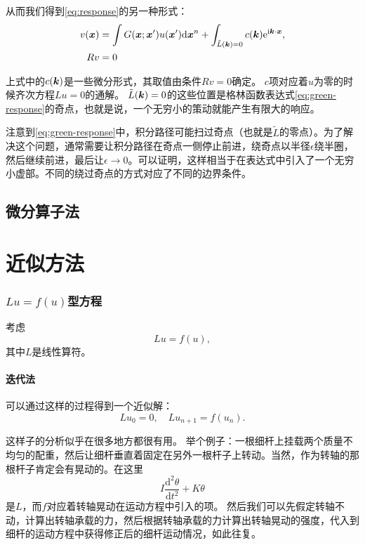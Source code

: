 \documentclass[UTF8, a4paper]{ctexart}
\newcommand*{\ii}{\mathrm{i}}
\newcommand*{\ee}{\mathrm{e}}
\begin{document}
从而我们得到\eqref{eq:response}的另一种形式：
\begin{equation}
    \begin{aligned}
        v(\vb*{x}) &= \int G(\vb*{x};\vb*{x}') u(\vb*{x}') \dd \vb*{x}^n 
        + \int_{\tilde{L}(\vb*{k})=0} c(\vb*{k}) \ee^{\ii \vb*{k} \cdot \vb*{x}}, \\
        R v &= 0
    \end{aligned}
\end{equation}

上式中的$c(\vb*{k})$是一些微分形式，其取值由条件$Rv=0$确定。
$c$项对应着$u$为零的时候齐次方程$Lu=0$的通解。
$\tilde{L}(\vb*{k})=0$的这些位置是格林函数表达式\eqref{eq:green-response}的奇点，也就是说，一个无穷小的策动就能产生有限大的响应。

注意到\eqref{eq:green-response}中，积分路径可能扫过奇点（也就是$\tilde{L}$的零点）。为了解决这个问题，通常需要让积分路径在奇点一侧停止前进，绕奇点以半径$\epsilon$绕半圈，然后继续前进，最后让$\epsilon \to 0$。可以证明，这样相当于在表达式中引入了一个无穷小虚部。不同的绕过奇点的方式对应了不同的边界条件。

\subsection{微分算子法}

\section{近似方法}

\subsubsection{$Lu=f(u)$型方程}
考虑
\[
    Lu = f(u),
\]
其中$L$是线性算符。

\paragraph{迭代法}可以通过这样的过程得到一个近似解：
\begin{equation}
    Lu_0 = 0, \quad Lu_{n+1} = f(u_n).
\end{equation}

这样子的分析似乎在很多地方都很有用。
举个例子：一根细杆上挂载两个质量不均匀的配重，然后让细杆垂直着固定在另外一根杆子上转动。当然，作为转轴的那根杆子肯定会有晃动的。在这里
\[
    I\frac{\mathrm{d}^2\theta}{\mathrm{d}t^2} + K \theta 
\]
是$L$，而$f$对应着转轴晃动在运动方程中引入的项。
然后我们可以先假定转轴不动，计算出转轴承载的力，然后根据转轴承载的力计算出转轴晃动的强度，代入到细杆的运动方程中获得修正后的细杆运动情况，如此往复。
\end{document}
